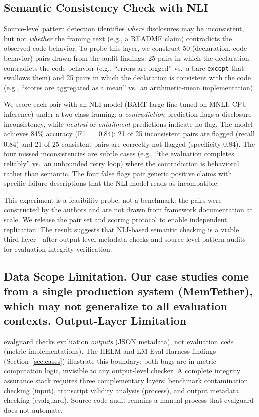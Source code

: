 \documentclass[11pt]{article}
\begin{document}
\subsection{Semantic Consistency Check with NLI}
\label{sec:nli}

Source-level pattern detection identifies \emph{where} disclosures may be inconsistent, but not \emph{whether} the framing text (e.g., a README claim) contradicts the observed code behavior. To probe this layer, we construct 50 (declaration, code-behavior) pairs drawn from the audit findings: 25 pairs in which the declaration contradicts the code behavior (e.g., ``errors are logged'' vs.\ a bare \texttt{except} that swallows them) and 25 pairs in which the declaration is consistent with the code (e.g., ``scores are aggregated as a mean'' vs.\ an arithmetic-mean implementation).

We score each pair with an NLI model (BART-large fine-tuned on MNLI; CPU inference) under a two-class framing: a \emph{contradiction} prediction flags a disclosure inconsistency, while \emph{neutral} or \emph{entailment} predictions indicate no flag. The model achieves 84\% accuracy (F1~$= 0.84$): 21 of 25 inconsistent pairs are flagged (recall 0.84) and 21 of 25 consistent pairs are correctly not flagged (specificity 0.84). The four missed inconsistencies are subtle cases (e.g., ``the evaluation completes reliably'' vs.\ an unbounded retry loop) where the contradiction is behavioral rather than semantic. The four false flags pair generic positive claims with specific failure descriptions that the NLI model reads as incompatible.

This experiment is a feasibility probe, not a benchmark: the pairs were constructed by the authors and are not drawn from framework documentation at scale. We release the pair set and scoring protocol to enable independent replication. The result suggests that NLI-based semantic checking is a viable third layer---after output-level metadata checks and source-level pattern audits---for evaluation integrity verification.
\subsection{Data Scope Limitation. Our case studies come from a single production system (MemTether), which may not generalize to all evaluation contexts. Output-Layer Limitation}

evalguard checks evaluation \emph{outputs} (JSON metadata), not evaluation \emph{code} (metric implementations). The HELM and LM Eval Harness findings (Section~\ref{sec:cases}) illustrate this boundary: both bugs are in metric computation logic, invisible to any output-level checker. A complete integrity assurance stack requires three complementary layers: benchmark contamination checking (input), transcript validity analysis (process), and output metadata checking (evalguard). Source code audit remains a manual process that evalguard does not automate.
\end{document}
